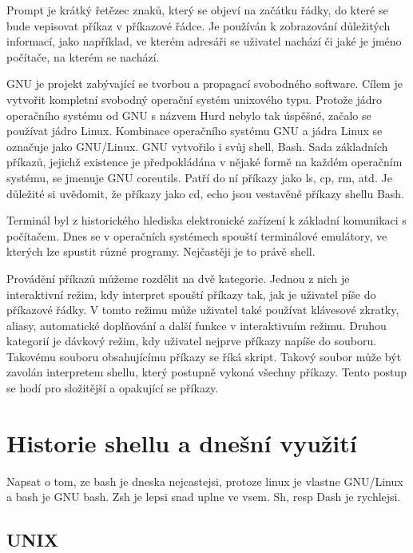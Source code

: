 \documentclass[thesis=M,czech]{FITthesis}[2012/06/26]
\begin{document}
Prompt je krátký řetězec znaků, který se objeví na začátku řádky, do které se bude vepisovat příkaz v příkazové řádce. Je používán k zobrazování důležitých informací, jako například, ve kterém adresáři se uživatel nachází či jaké je jméno počítače, na kterém se nachází.


GNU je projekt zabývající se tvorbou a propagací svobodného software. Cílem je vytvořit kompletní svobodný operační systém unixového typu. Protože jádro operačního systému od GNU s názvem Hurd nebylo tak úspěšné, začalo se používat jádro Linux. Kombinace operačního systému GNU a jádra Linux se označuje jako GNU/Linux. GNU vytvořilo i svůj shell, Bash. Sada základních příkazů, jejichž existence je předpokládána v nějaké formě na každém operačním systému, se jmenuje GNU coreutils. Patří do ní příkazy jako ls, cp, rm, atd. Je důležité si uvědomit, že příkazy jako cd, echo jsou vestavěné příkazy shellu Bash.


Terminál byl z historického hlediska elektronické zařízení k základní komunikaci s počítačem. Dnes se v operačních systémech spouští terminálové emulátory, ve kterých lze spustit různé programy. Nejčastěji je to právě shell.


Provádění příkazů můžeme rozdělit na dvě kategorie. Jednou z nich je interaktivní režim, kdy interpret spouští příkazy tak, jak je uživatel píše do příkazové řádky. V tomto režimu může uživatel také používat klávesové zkratky, aliasy, automatické doplňování a další funkce v interaktivním režimu. Druhou kategorií je dávkový režim, kdy uživatel nejprve příkazy napíše do souboru. Takovému souboru obsahujícímu příkazy se říká skript. Takový soubor může být zavolán interpretem shellu, který postupně vykoná všechny příkazy. Tento postup se hodí pro složitější a opakující se příkazy.

\chapter{Historie shellu a dnešní využití}

Napsat o tom, ze bash je dneska nejcastejsi, protoze linux je vlastne GNU/Linux a bash je GNU bash. Zsh je lepsi snad uplne ve vsem. Sh, resp Dash je rychlejsi.

\section{UNIX}
\end{document}
